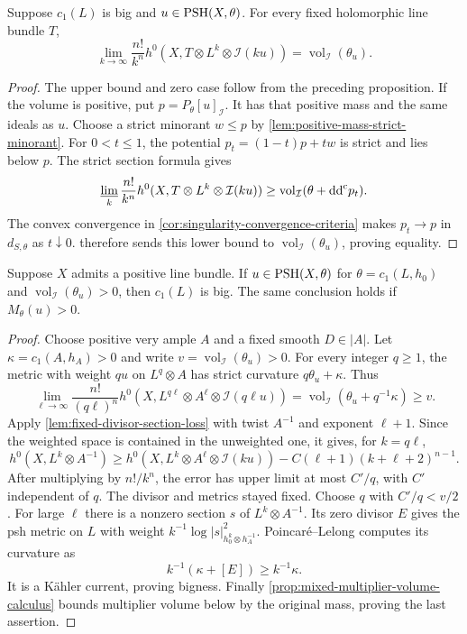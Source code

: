 
\begin{theorem}\label{thm:big-class-singular-section-asymptotic}
Suppose $c_1(L)$ is big and $u\in\mathrm{PSH}(X,\theta)$. For every fixed holomorphic line bundle $T$,
\[
 \lim_{k\to\infty}\frac{n!}{k^n}
 h^0(X,T\otimes L^k\otimes\mathcal I(ku))
       =\operatorname{vol}_{\mathcal I}(\theta_u).
\]
\end{theorem}
\begin{proof}
The upper bound and zero case follow from the preceding proposition. If the volume is positive, put $p=P_\theta[u]_{\mathcal I}$. It has that positive mass and the same ideals as $u$. Choose a strict minorant $w\leq p$ by \cref{lem:positive-mass-strict-minorant}. For $0<t\leq1$, the potential $p_t=(1-t)p+t w$ is strict and lies below $p$. The strict section formula gives
\[
 \varliminf_k\frac{n!}{k^n}h^0(X,T\otimes L^k\otimes\mathcal I(ku))
    \geq\operatorname{vol}_{\mathcal I}(\theta+\mathrm{dd}^{\mathrm{c}} p_t).
\]
The convex convergence in \cref{cor:singularity-convergence-criteria} makes $p_t\to p$ in $d_{S,\theta}$ as $t\downarrow0$.  therefore sends this lower bound to $\operatorname{vol}_{\mathcal I}(\theta_u)$, proving equality.
\end{proof}

\begin{proposition}\label{prop:projective-positive-multiplier-volume-big}
Suppose $X$ admits a positive line bundle. If $u\in\mathrm{PSH}(X,\theta)$ for $\theta=c_1(L,h_0)$ and $\operatorname{vol}_{\mathcal I}(\theta_u)>0$, then $c_1(L)$ is big. The same conclusion holds if $M_\theta(u)>0$.
\end{proposition}
\begin{proof}
Choose positive very ample $A$ and a fixed smooth $D\in|A|$. Let $\kappa=c_1(A,h_A)>0$ and write $v=\operatorname{vol}_{\mathcal I}(\theta_u)>0$. For every integer $q\geq1$, the metric with weight $qu$ on $L^q\otimes A$ has strict curvature $q\theta_u+\kappa$. Thus
\[
 \lim_{\ell\to\infty}\frac{n!}{(q\ell)^n}
 h^0(X,L^{q\ell}\otimes A^\ell\otimes\mathcal I(q\ell u))
   =\operatorname{vol}_{\mathcal I}(\theta_u+q^{-1}\kappa)\geq v.
\]
Apply \cref{lem:fixed-divisor-section-loss} with twist $A^{-1}$ and exponent $\ell+1$. Since the weighted space is contained in the unweighted one, it gives, for $k=q\ell$,
\[
 h^0(X,L^k\otimes A^{-1})
  \geq h^0(X,L^k\otimes A^\ell\otimes\mathcal I(ku))
       -C(\ell+1)(k+\ell+2)^{n-1}.
\]
After multiplying by $n!/k^n$, the error has upper limit at most $C'/q$, with $C'$ independent of $q$. The divisor and metrics stayed fixed. Choose $q$ with $C'/q<v/2$. For large $\ell$ there is a nonzero section $s$ of $L^k\otimes A^{-1}$. Its zero divisor $E$ gives the psh metric on $L$ with weight $k^{-1}\log|s|^2_{h_0^k\otimes h_A^{-1}}$. Poincar\'e--Lelong computes its curvature as
\[
 k^{-1}(\kappa+[E])\geq k^{-1}\kappa.
\]
It is a K\"ahler current, proving bigness. Finally \cref{prop:mixed-multiplier-volume-calculus} bounds multiplier volume below by the original mass, proving the last assertion.
\end{proof}


